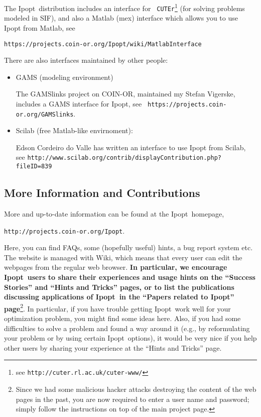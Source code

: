 \documentclass[10pt]{article}
\newcommand{\Ipopt}{{\sc Ipopt}}
\begin{document}
The \Ipopt\ distribution includes an interface for {\tt
  CUTEr}\footnote{see {\tt http://cuter.rl.ac.uk/cuter-www/}} (for
  solving problems modeled in SIF), and also a Matlab (mex) interface
  which allows you to use Ipopt from Matlab, see

\centerline{\tt https://projects.coin-or.org/Ipopt/wiki/MatlabInterface}


There are also interfaces maintained by other people:
\begin{itemize}
\item GAMS (modeling environment)

  The GAMSlinks project on COIN-OR, maintained my Stefan Vigerske,
  includes a GAMS interface for Ipopt, see {\tt
  https://projects.coin-or.org/GAMSlinks}.
\item Scilab (free Matlab-like envirnoment):

  Edson Cordeiro do Valle has written an interface to use Ipopt from
  Scilab,\\ see {\tt http://www.scilab.org/contrib/displayContribution.php?fileID=839}
\end{itemize}

\subsection{More Information and Contributions}
More and up-to-date information can be found at the \Ipopt\ homepage,

\begin{center}
\texttt{http://projects.coin-or.org/Ipopt}.
\end{center}

Here, you can find FAQs, some (hopefully useful) hints, a bug report
system etc.  The website is managed with Wiki, which means that every
user can edit the webpages from the regular web browser.  {\bf In
  particular, we encourage \Ipopt\ users to share their experiences
  and usage hints on the ``Success Stories'' and ``Hints and Tricks''
  pages, or to list the publications discussing applications of
  \Ipopt\ in the ``Papers related to Ipopt'' page}\footnote{Since we
  had some malicious hacker attacks destroying the content of the web
  pages in the past, you are now required to enter a user name and
  password; simply follow the instructions on top of the main project
  page.}.  In particular, if you have trouble getting \Ipopt\ work
well for your optimization problem, you might find some ideas here.
Also, if you had some difficulties to solve a problem and found a way
around it (e.g., by reformulating your problem or by using certain
\Ipopt\ options), it would be very nice if you help other users by
sharing your experience at the ``Hints and Tricks'' page.
\end{document}
